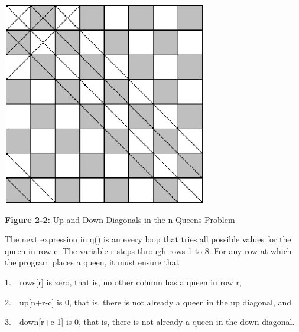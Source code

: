 \bigskip

\begin{center}
\includegraphics[width=3.5in,height=3.5in]{ub-img/diagonal.png}
\end{center}
{\sffamily\bfseries Figure 2-2:}
{\sffamily Up and Down Diagonals in the n-Queens Problem}

\bigskip


The next expression in \textsf{q()} is an \textsf{every} loop that tries
all possible values for the queen in row \textsf{c}. The variable
\textsf{r} steps through rows 1 to 8. For any row at which the program
places a queen, it must ensure that

1.\ \ \textsf{rows[r]} is zero, that is, no other column has a queen in
row \textsf{r}\textsf{,}

2.\ \ \textsf{up[n+r-c]} is 0, that is, there is not already a queen in
the {\textquotedbl}up{\textquotedbl} diagonal, and

3.\ \ \textsf{down[r+c-1]} is 0, that is, there is not already a queen
in the down diagonal.

